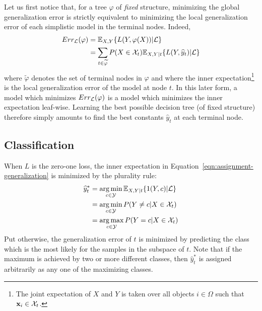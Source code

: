 Let us first notice that, for a tree $\varphi$ of \textit{fixed} structure,
minimizing the global generalization error is strictly equivalent to minimizing
the local generalization error of each simplistic model in the terminal nodes.
Indeed,
\begin{align}
Err_{\cal L}(\varphi) &= \mathbb{E}_{X,Y} \{ L(Y, \varphi(X)) | {\cal L} \} \nonumber \\
                      &= \sum_{t \in \widetilde{\varphi}} P(X \in {\cal X}_t) \mathbb{E}_{X,Y|t} \{ L(Y, \widehat{y}_t) | {\cal L} \} \label{eqn:assignment-generalization}
\end{align}
where $\widetilde{\varphi}$ denotes the set of terminal nodes in $\varphi$
and where the inner expectation\footnote{The joint expectation of $X$ and $Y$
is taken over all objects $i \in \Omega$ such that $\mathbf{x}_i \in {\cal X}_t$.}
is the local generalization error of the model at node $t$. In this later form,
a model which minimizes $Err_{\cal L}(\varphi)$ is a model which minimizes the inner
expectation leaf-wise. Learning the best possible decision tree (of
fixed structure) therefore simply amounts to find the best constants
$\widehat{y}_t$ at each terminal node.

\subsection{Classification}

When $L$ is the zero-one loss, the inner expectation in Equation~\ref{eqn:assignment-generalization}
is minimized by the plurality rule:
\begin{align}
\widehat{y}_t^* &= \operatorname*{arg\,min}_{c \in {\cal Y}} \mathbb{E}_{X, Y|t}\{ 1(Y, c) | {\cal L} \} \nonumber \\
                &= \operatorname*{arg\,min}_{c \in {\cal Y}} P(Y \neq c | X \in {\cal X}_t) \nonumber \\
                &= \operatorname*{arg\,max}_{c \in {\cal Y}} P(Y = c | X \in {\cal X}_t)\label{eqn:assignment-classification}
\end{align}
Put otherwise, the generalization error of $t$ is minimized by predicting
the class which is the most likely for the samples in the subspace of $t$.
Note that if the maximum is achieved by two or more different classes, then
$\widehat{y}_t^*$ is assigned arbitrarily as any one of the maximizing classes.

